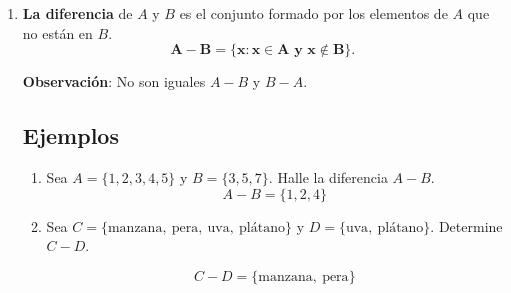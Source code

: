 \documentclass[12pt]{article}
\begin{document}
\begin{enumerate}
\begin{enumerate}
   
    \[
    A \cap B = \{\text{Luis},\ \text{Pedro}\}
    \]

\end{enumerate}
\item \textbf{La diferencia} de $A$ y $B$ es el conjunto formado por los elementos de $A$ que no están en $B$.
$$\mathbf{A-B = \{x: x\in A \text{ y } x\notin B\}}.$$

\begin{center}

\end{center}

\textbf{Observación}: No son iguales $A-B$ y $B-A$.

\subsection*{Ejemplos}
\begin{enumerate}

    \item Sea \(A = \{1, 2, 3, 4, 5\}\) 
    y \(B = \{3, 5, 7\}\).  
    Halle la diferencia \(A - B\).
    \[
    A - B = \{1, 2, 4\}
    \]

    \item Sea \(C = \{\text{manzana},\ \text{pera},\ \text{uva},\ \text{plátano}\}\)
    y \(D = \{\text{uva},\ \text{plátano}\}\).  
    Determine \(C - D\).

    
    \[
    C - D = \{\text{manzana},\ \text{pera}\}
    \]


\end{enumerate}
\end{enumerate}
\end{document}
